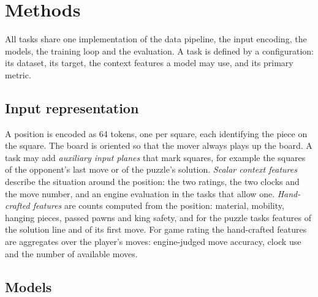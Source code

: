 \documentclass[11pt]{article}
\begin{document}
\section{Methods}
\label{sec:harness}

All tasks share one implementation of the data pipeline, the input encoding,
the models, the training loop and the evaluation. A task is defined by a
configuration: its dataset, its target, the context features a model may use,
and its primary metric.

\subsection{Input representation}

A position is encoded as 64 tokens, one per square, each identifying the
piece on the square. The board is oriented so that the mover always
plays up the board. A task may add \emph{auxiliary input planes} that mark
squares, for example the squares of the opponent's last move or of the
puzzle's solution. \emph{Scalar context features} describe the situation
around the position: the two ratings, the two clocks and the move number,
and an engine evaluation in the tasks that allow one. \emph{Hand-crafted
features} are counts computed from the position: material, mobility, hanging
pieces, passed pawns and king safety, and for the puzzle tasks features of
the solution line and of its first move. For game rating the hand-crafted
features are aggregates over the player's moves: engine-judged move
accuracy, clock use and the number of available moves.

\subsection{Models}
\label{sec:sequence}
\end{document}
